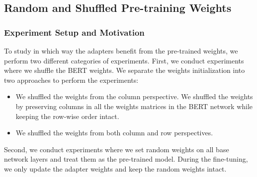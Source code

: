 \subsection{Random and Shuffled Pre-training Weights}
\label{ssec:randshuff}
\subsubsection{Experiment Setup and Motivation}
To study in which way the adapters benefit from the pre-trained weights, we perform two different categories of experiments.
First, we conduct experiments where we shuffle the BERT weights. We separate the weights initialization into two approaches to perform the experiments:
\begin{itemize}
    \item We shuffled the weights from the column perspective. We shuffled the weights by preserving columns in all the weights matrices in the BERT network while keeping the row-wise order intact.
    \item We shuffled the weights from both column and row perspectives.
\end{itemize}

Second, we conduct experiments where we set random weights on all base network layers and treat them as the pre-trained model. During the fine-tuning, we only update the adapter weights and keep the random weights intact.

